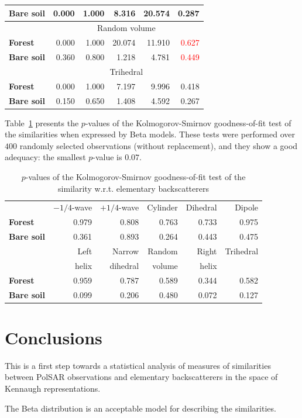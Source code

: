 \documentclass[conference]{IEEEtran}
\begin{document}
\begin{table}[hbt]
\begin{tabular}{lrrrrr}
\textbf{Bare soil} & 0.000 & 1.000 & 8.316 & 20.574 & 0.287\\
\midrule
%
& \multicolumn{5}{c}{Random volume}\\
\cmidrule(lr){2-6}
\textbf{Forest} & 0.000 & 1.000 & 20.074 & 11.910 & \textcolor{red}{0.627}\\
\textbf{Bare soil} & 0.360 & 0.800 & 1.218 & 4.781 & \textcolor{red}{0.449}\\
\midrule
%
& \multicolumn{5}{c}{Trihedral}\\
\cmidrule(lr){2-6}
\textbf{Forest} & 0.000 & 1.000 & 7.197 & 9.996 & 0.418\\
\textbf{Bare soil} & 0.150 & 0.650 & 1.408 & 4.592 & 0.267\\
\bottomrule
\end{tabular}
\end{table}

Table~\ref{tab:pvalues_table} presents the $p$-values of the Kolmogorov-Smirnov goodness-of-fit test of the similarities when expressed by Beta models.
These tests were performed over $400$ randomly selected observations (without replacement), and they show a good adequacy: the smallest $p$-value is $0.07$.

\begin{table}[hbt]
\centering
\caption{$p$-values of the Kolmogorov-Smirnov goodness-of-fit test of the similarity w.r.t. elementary backscatterers}\label{tab:pvalues_table}
\begin{tabular}{lrrrrr}
\toprule
& $-1/4$-wave & $+1/4$-wave & Cylinder & Dihedral & Dipole\\
\cmidrule(lr){2-6}
\textbf{Forest} & 0.979 & 0.808 & 0.763 & 0.733 & 0.975\\
\textbf{Bare soil} & 0.361 & 0.893 & 0.264 & 0.443 & 0.475\\
\midrule
& Left & Narrow & Random & Right & Trihedral\\
             & helix & dihedral & volume & helix & \\
\cmidrule(lr){2-6}
\textbf{Forest} & 0.959 & 0.787 & 0.589 & 0.344 & 0.582\\
\textbf{Bare soil} & 0.099 & 0.206 & 0.480 & 0.072 & 0.127\\
\bottomrule
\end{tabular} 
\end{table}

\section{Conclusions}

This is a first step towards a statistical analysis of measures of similarities between PolSAR observations and elementary backscatterers in the space of Kennaugh representations.

The Beta distribution is an acceptable model for describing the similarities.



\end{document}
